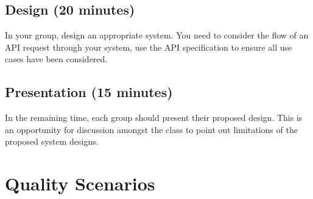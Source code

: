 \documentclass{csse4400}
\begin{document}
\subsection*{Design (20 minutes)}

In your group, design an appropriate system.
You need to consider the flow of an API request through your system,
use the API specification to ensure all use cases have been considered.


\subsection*{Presentation (15 minutes)}

In the remaining time,
each group should present their proposed design.
This is an opportunity for discussion amongst the class to point out limitations of the proposed system designs.

\section{Quality Scenarios}\label{sec:scenarios}
\end{document}
